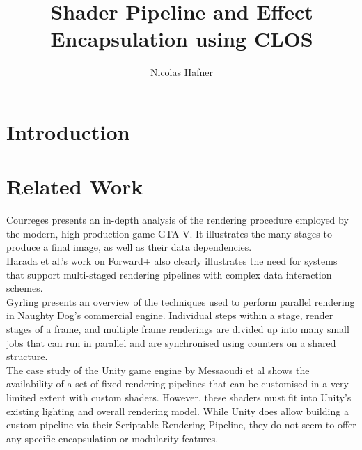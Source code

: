 \documentclass[format=sigconf]{acmart}
\begin{document}
\title{Shader Pipeline and Effect Encapsulation using CLOS}

\author{Nicolas Hafner}

\begin{abstract}
\end{abstract}

\begin{CCSXML}
\end{CCSXML}


\maketitle

\newpage

\def\abovecaptionskip{1pt}
\def\listingautorefname{listing}
\def\figureautorefname{figure}

\section{Introduction}\label{introduction}


\section{Related Work}\label{relatedwork}
Courreges\cite{gtav} presents an in-depth analysis of the rendering procedure employed by the modern, high-production game GTA V. It illustrates the many stages to produce a final image, as well as their data dependencies. \\

Harada et al.'s work on Forward+\cite{forward+}\cite{forward+talk} also clearly illustrates the need for systems that support multi-staged rendering pipelines with complex data interaction schemes. \\

Gyrling\cite{fibers} presents an overview of the techniques used to perform parallel rendering in Naughty Dog's commercial engine. Individual steps within a stage, render stages of a frame, and multiple frame renderings are divided up into many small jobs that can run in parallel and are synchronised using counters on a shared structure. \\

The case study of the Unity game engine by Messaoudi et al\cite{unity} shows the availability of a set of fixed rendering pipelines that can be customised in a very limited extent with custom shaders. However, these shaders must fit into Unity's existing lighting and overall rendering model. While Unity does allow building a custom pipeline via their Scriptable Rendering Pipeline\cite{unitycustom}, they do not seem to offer any specific encapsulation or modularity features. \\
\end{document}
